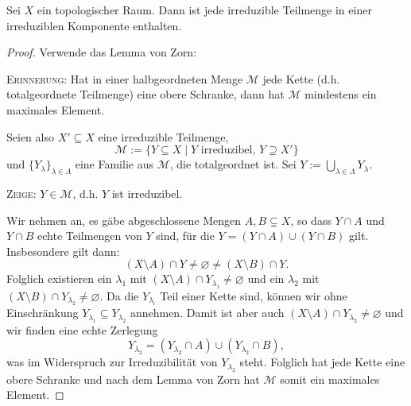 \documentclass[a4paper,12pt,index=toc]{scrbook}
\theoremstyle{keinenummern} %
\def\M{\mathcal{M}}
\newcommand{\leer}{\ensuremath{\varnothing}}
\begin{document}
\begin{prop}\label{1.2.10} Sei $X$ ein topologischer Raum. Dann ist jede irreduzible Teilmenge in einer irreduziblen Komponente enthalten.\end{prop}
\begin{proof} Verwende das Lemma von Zorn:

{\scshape Erinnerung:} Hat in einer halbgeordneten Menge $\M$ jede Kette (d.h. totalgeordnete Teilmenge) eine obere Schranke, dann hat $\M$ mindestens ein maximales Element.

Seien also $X'\subseteq X$ eine irreduzible Teilmenge, 
\begin{equation*}\M:=\{Y\subseteq X\mid Y\text{ irreduzibel, }Y\supseteq X'\}\end{equation*}
und $\{Y_{\lambda}\}_{\lambda\in\Lambda}$ eine Familie aus $\M$, die totalgeordnet ist. Sei $\displaystyle Y:=\bigcup_{\lambda\in\Lambda}Y_{\lambda}$.

{\scshape Zeige:} $Y\in\M$, d.h. $Y$ ist irreduzibel.

Wir nehmen an, es gäbe abgeschlossene Mengen $A,B\subsetneq X$, so dass $Y\cap A$ und $Y\cap B$ echte Teilmengen von $Y$ sind, für die $Y=(Y\cap A)\cup(Y\cap B)$ gilt. Insbesondere gilt dann:
\begin{equation*}(X\setminus A)\cap Y\neq\leer\neq (X\setminus B)\cap Y.\end{equation*}
Folglich existieren ein $\lambda_{1}$ mit $(X\setminus A)\cap Y_{\lambda_{1}}\neq\leer$ und ein $\lambda_{2}$ mit $(X\setminus B)\cap Y_{\lambda_{2}}\neq\leer$. Da die $Y_{\lambda_{i}}$ Teil einer Kette sind, können wir ohne Einschränkung $Y_{\lambda_{1}}\subseteq Y_{\lambda_{2}}$ annehmen. Damit ist aber auch $(X\setminus A)\cap Y_{\lambda_{2}}\neq\leer$ und wir finden eine echte Zerlegung
\begin{equation*}Y_{\lambda_{2}}=(Y_{\lambda_{2}}\cap A)\cup(Y_{\lambda_{2}}\cap B),\end{equation*}
was im Widerspruch zur Irreduzibilität von $Y_{\lambda_{2}}$ steht. Folglich hat jede Kette eine obere Schranke und nach dem Lemma von Zorn hat $\M$ somit ein maximales Element.
\end{proof}
\end{document}
